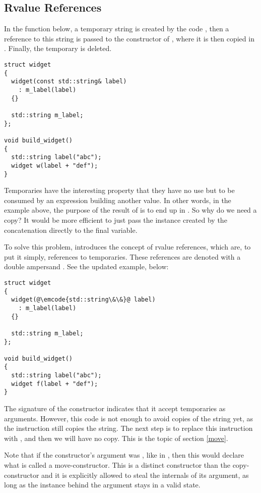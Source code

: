 \subsection{Rvalue References}

In the function  below, a temporary string is
created by the code , then a reference to this
string is passed to the constructor of , where it is then
copied in . Finally, the temporary is deleted.

\begin{lstlisting}
struct widget
{
  widget(const std::string& label)
    : m_label(label)
  {}

  std::string m_label;
};

void build_widget()
{
  std::string label("abc");
  widget w(label + "def");
}
\end{lstlisting}

Temporaries have the interesting property that they have no use but to
be consumed by an expression building another value. In other words,
in the example above, the purpose of the result of  is to end up in . So why do we need a
copy? It would be more efficient to just pass the instance created by
the concatenation directly to the final variable.

\bigskip

To solve this problem,  introduces the concept of rvalue
references, which are, to put it simply, references to
temporaries. These references are denoted with a double ampersand
\code{\&\&}. See the updated example, below:

\begin{lstlisting}
struct widget
{
  widget(@\emcode{std::string\&\&}@ label)
    : m_label(label)
  {}

  std::string m_label;
};

void build_widget()
{
  std::string label("abc");
  widget f(label + "def");
}
\end{lstlisting}

The signature of the constructor indicates that it accept temporaries
as arguments. However, this code is not enough to avoid copies of the
string yet, as the instruction  still copies the
string. The next step is to replace this instruction with
, and then we will have no copy. This
is the topic of section \ref{move}.

Note that if the constructor's argument was , like in
, then this would declare what is called
a move-constructor. This is a distinct constructor than the
copy-constructor and it is explicitly allowed to steal the internals
of its argument, as long as the instance behind the argument stays in
a valid state.

